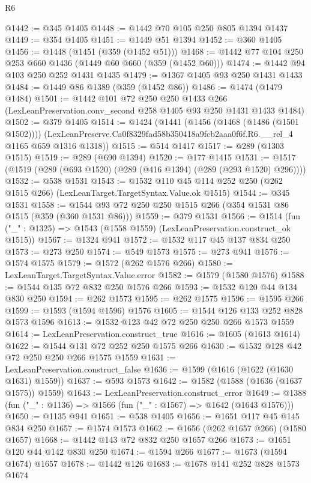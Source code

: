 \begin{lexlean}{R6}
\begin{coremodule}
@1442 := @345 @1405
@1448 := @1442 @70 @105 @250 @805 @1394 @1437
@1449 := @354 @1405
@1451 := @1449 @51 @1394
@1452 := @360 @1405
@1456 := @1448 (@1451 (@359 (@1452 @51)))
@1468 := @1442 @77 @104 @250 @253 @660 @1436 (@1449 @60 @660 (@359 (@1452 @60)))
@1474 := @1442 @94 @103 @250 @252 @1431 @1435
@1479 := @1367 @1405 @93 @250 @1431 @1433
@1484 := @1449 @86 @1389 (@359 (@1452 @86))
@1486 := @1474 (@1479 @1484)
@1501 := @1442
    @101
    @72
    @250
    @250
    @1433
    @266
    (LexLeanPreservation.conv_second @258 @1405 @93 @250 @1431 @1433 @1484)
@1502 := @379 @1405
@1514 := @1424
    (@1441
      (@1456 (@1468 (@1486 (@1501 @1502))))
      (LexLeanPreserve.Ca0f8329fad58b350418a9fcb2aaa0f6f.R6.__rel_4 @1165 @659 @1316 @1318))
@1515 := @514 @1417
@1517 := @289 (@1303 @1515)
@1519 := @289 (@690 @1394)
@1520 := @177 @1415
@1531 := @1517 (@1519 (@289 (@693 @1520) (@289 (@416 @1394) (@289 (@293 @1520) @296))))
@1532 := @538 @1531
@1543 := @1532 @110 @45 @114 @252 @250 (@262 @1515 @266) (LexLeanTarget.TargetSyntax.Value.ok @1515)
@1544 := @345 @1531
@1558 := @1544 @93 @72 @250 @250 @1515 @266 (@354 @1531 @86 @1515 (@359 (@360 @1531 @86)))
@1559 := @379 @1531
@1566 := @1514 (fun ("_" : @1325) => @1543 (@1558 @1559) (LexLeanPreservation.construct_ok @1515))
@1567 := @1324 @941
@1572 := @1532 @117 @45 @137 @834 @250
@1573 := @273 @250
@1574 := @549 @1573
@1575 := @273 @941
@1576 := @1574 @1575
@1579 := @1572 (@262 @1576 @266)
@1580 := LexLeanTarget.TargetSyntax.Value.error
@1582 := @1579 (@1580 @1576)
@1588 := @1544 @135 @72 @832 @250 @1576 @266
@1593 := @1532 @120 @44 @134 @830 @250
@1594 := @262 @1573
@1595 := @262 @1575
@1596 := @1595 @266
@1599 := @1593 (@1594 @1596) @1576
@1605 := @1544 @126 @133 @252 @828 @1573 @1596
@1613 := @1532 @123 @42 @72 @250 @250 @266 @1573 @1559
@1614 := LexLeanPreservation.construct_true
@1616 := @1605 (@1613 @1614)
@1622 := @1544 @131 @72 @252 @250 @1575 @266
@1630 := @1532 @128 @42 @72 @250 @250 @266 @1575 @1559
@1631 := LexLeanPreservation.construct_false
@1636 := @1599 (@1616 (@1622 (@1630 @1631) @1559))
@1637 := @593 @1573
@1642 := @1582 (@1588 (@1636 (@1637 @1575)) @1559)
@1643 := LexLeanPreservation.construct_error
@1649 := @1388 (fun ("_" : @1136) => @1566 (fun ("_" : @1567) => @1642 (@1643 @1576)))
@1650 := @1135 @941
@1651 := @538 @1405
@1656 := @1651 @117 @45 @145 @834 @250
@1657 := @1574 @1573
@1662 := @1656 (@262 @1657 @266) (@1580 @1657)
@1668 := @1442 @143 @72 @832 @250 @1657 @266
@1673 := @1651 @120 @44 @142 @830 @250
@1674 := @1594 @266
@1677 := @1673 (@1594 @1674) @1657
@1678 := @1442 @126
@1683 := @1678 @141 @252 @828 @1573 @1674

\end{coremodule}
\end{lexlean}
